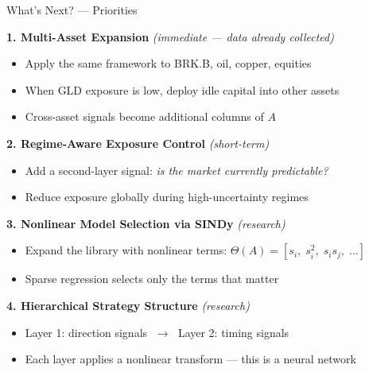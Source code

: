 \documentclass[aspectratio=169]{beamer}
\begin{document}
\begin{frame}{What's Next? — Priorities}

  \textbf{1. Multi-Asset Expansion} \hfill \textit{(immediate — data already collected)}
  \begin{itemize}
    \item Apply the same framework to BRK.B, oil, copper, equities
    \item When GLD exposure is low, deploy idle capital into other assets
    \item Cross-asset signals become additional columns of $A$
  \end{itemize}

  \vspace{0.4em}
  \textbf{2. Regime-Aware Exposure Control} \hfill \textit{(short-term)}
  \begin{itemize}
    \item Add a second-layer signal: \emph{is the market currently predictable?}
    \item Reduce exposure globally during high-uncertainty regimes
  \end{itemize}

  \vspace{0.4em}
  \textbf{3. Nonlinear Model Selection via SINDy} \hfill \textit{(research)}
  \begin{itemize}
    \item Expand the library with nonlinear terms: \(\Theta(A) = [s_i,\; s_i^2,\; s_i s_j,\; \dots]\)
    \item Sparse regression selects only the terms that matter
  \end{itemize}

  \vspace{0.4em}
  \textbf{4. Hierarchical Strategy Structure} \hfill \textit{(research)}
  \begin{itemize}
    \item Layer 1: direction signals $\;\longrightarrow\;$ Layer 2: timing signals
    \item Each layer applies a nonlinear transform — this is a neural network
  \end{itemize}

\end{frame}
\end{document}
